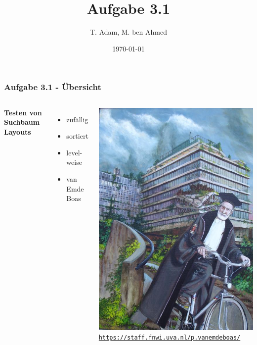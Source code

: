 \documentclass[aspectratio=169]{beamer}
\title[Aufgabe 1.1]{Aufgabe 3.1} %
\author{T. Adam, M. ben Ahmed} %
\institute[UOS] %
{

Universität Osnabrück \\ %

\medskip
\textit{Æ} %


}
\date{\today} %
\begin{document}
\begin{frame}
\titlepage %
\end{frame}







\begin{frame}
	\frametitle{Aufgabe 3.1 - Übersicht}
	\begin{columns}[c] %
		
		\textbf{Testen von Suchbaum Layouts}
		\begin{itemize}
			\item zufällig
			\item sortiert
			\item level-weise
			\item van Emde Boas
		\end{itemize}

		\includegraphics[scale=.2]{portretPeter.jpg}
		\tiny \texttt{\url{https://staff.fnwi.uva.nl/p.vanemdeboas/}}
		

\end{columns}
\end{frame}
\end{document}
